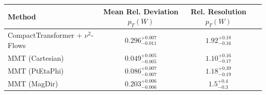     \begin{tabular}{lccc}
        \toprule
        Method & Mean Rel. Deviation $p_{T}(W)$ & Rel. Resolution $p_{T}(W)$ \\
        \midrule
        CompactTransformer + $\nu^2$-Flows & $0.296^{+0.007}_{-0.011}$ & $1.92^{+0.18}_{-0.16}$ \\
        MMT (Cartesian) & $0.049^{+0.005}_{-0.005}$ & $1.10^{+0.16}_{-0.17}$ \\
        MMT (PtEtaPhi) & $0.086^{+0.007}_{-0.007}$ & $1.18^{+0.39}_{-0.19}$ \\
        MMT (MagDir) & $0.203^{+0.006}_{-0.006}$ & $1.5^{+0.4}_{-0.3}$ \\
        \bottomrule
    \end{tabular}